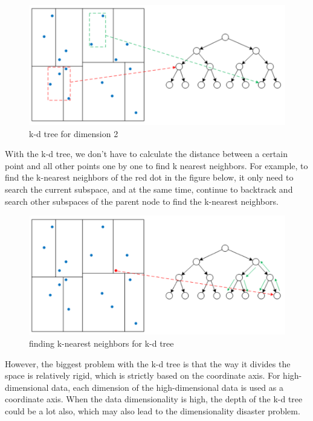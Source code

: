 \begin{figure}[ht]

\centering
\includegraphics[scale=0.85]{images/image_largevis_k-d_tree_1.PNG}
\caption{k-d tree for dimension 2}
\label{fig:label}
\end{figure}

\noindent With the k-d tree, we don't have to calculate the distance between a certain point and all other points one by one to find k nearest neighbors. For example, to find the k-nearest neighbors of the red dot in the figure below, it only need to search the current subspace, and at the same time, continue to backtrack and search other subspaces of the parent node to find the k-nearest neighbors.\\

\begin{figure}[ht]

\centering
\includegraphics[scale=0.85]{images/image_largevis_k-d_tree_2.PNG}
\caption{finding k-nearest neighbors for k-d tree}
\label{fig:label}
\end{figure}

\noindent However, the biggest problem with the k-d tree is that the way it divides the space is relatively rigid, which is strictly based on the coordinate axis. For high-dimensional data, each dimension of the high-dimensional data is used as a coordinate axis. When the data dimensionality is high, the depth of the k-d tree could be a lot also, which may also lead to the dimensionality disaster problem.\\

